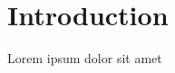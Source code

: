 \documentclass{article}
\begin{document}
    \section{Introduction}
    Lorem ipsum dolor sit amet\\
\end{document}
